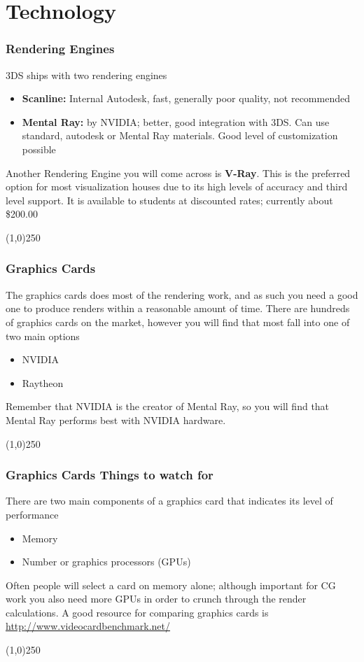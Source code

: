 \section{Technology}


\begin{frame}
\frametitle{Rendering Engines}
3DS ships with two rendering engines
\begin{itemize}
	\item \textbf{Scanline:} Internal Autodesk, fast, generally poor quality, not recommended
	\item \textbf{Mental Ray:} by NVIDIA; better, good integration with 3DS.  Can use standard, autodesk or Mental Ray materials.  Good level of customization possible
\end{itemize}
Another Rendering Engine you will come across is \textbf{V-Ray}. This is the preferred option for most visualization houses due to its high levels of accuracy and third level support.  It is available to students at discounted rates; currently about \$200.00
\end{frame}
\begin{center}\line(1,0){250}\end{center}



\begin{frame}
\frametitle{Graphics Cards}
The graphics cards does most of the rendering work, and as such you need a good one to produce renders within a reasonable amount of time.  There are hundreds of graphics cards on the market, however you will find that most fall into one of two main options
\begin{itemize}
	\item NVIDIA
	\item Raytheon
\end{itemize}
Remember that NVIDIA is the creator of Mental Ray, so you will find that Mental Ray performs best with NVIDIA hardware.
\end{frame}
\begin{center}\line(1,0){250}\end{center}


\begin{frame}
\frametitle{Graphics Cards \hfill\hfill Things to watch for}
There are two main components of a graphics card that indicates its level of performance
\begin{itemize}
	\item Memory
	\item Number or graphics processors (GPUs)
\end{itemize}
Often people will select a card on memory alone; although important for CG work you also need more GPUs in order to crunch through the render calculations.  A good resource for comparing graphics cards is \href{http://www.videocardbenchmark.net/}{http://www.videocardbenchmark.net/}
\end{frame}
\begin{center}\line(1,0){250}\end{center}



